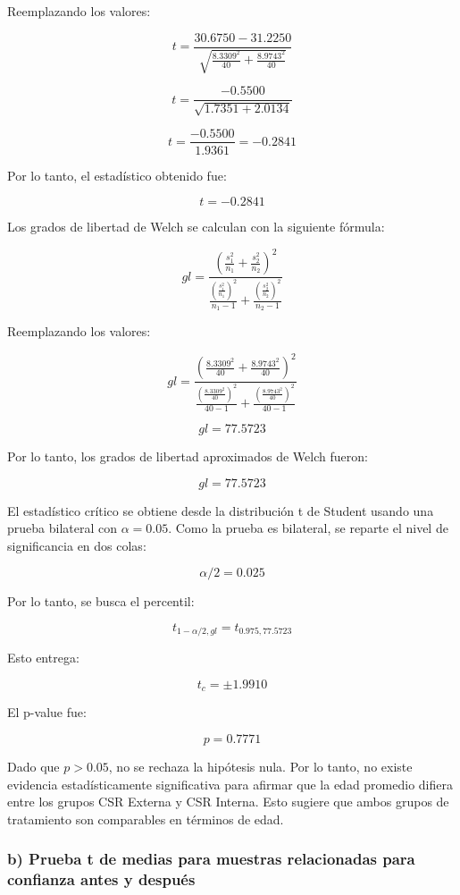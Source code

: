 \documentclass[12pt,letterpaper]{article}
\begin{document}
Reemplazando los valores:

\[
t =
\frac{30.6750 - 31.2250}
{\sqrt{\frac{8.3309^2}{40} + \frac{8.9743^2}{40}}}
\]

\[
t =
\frac{-0.5500}
{\sqrt{1.7351 + 2.0134}}
\]

\[
t =
\frac{-0.5500}{1.9361}
= -0.2841
\]

Por lo tanto, el estadístico obtenido fue:

\[
t = -0.2841
\]

Los grados de libertad de Welch se calculan con la siguiente fórmula:

\[
gl =
\frac{
\left(\frac{s_1^2}{n_1} + \frac{s_2^2}{n_2}\right)^2
}{
\frac{\left(\frac{s_1^2}{n_1}\right)^2}{n_1 - 1}
+
\frac{\left(\frac{s_2^2}{n_2}\right)^2}{n_2 - 1}
}
\]

Reemplazando los valores:

\[
gl =
\frac{
\left(\frac{8.3309^2}{40} + \frac{8.9743^2}{40}\right)^2
}{
\frac{\left(\frac{8.3309^2}{40}\right)^2}{40 - 1}
+
\frac{\left(\frac{8.9743^2}{40}\right)^2}{40 - 1}
}
\]

\[
gl = 77.5723
\]

Por lo tanto, los grados de libertad aproximados de Welch fueron:

\[
gl = 77.5723
\]

El estadístico crítico se obtiene desde la distribución t de Student usando una prueba bilateral con \(\alpha = 0.05\). Como la prueba es bilateral, se reparte el nivel de significancia en dos colas:

\[
\alpha/2 = 0.025
\]

Por lo tanto, se busca el percentil:

\[
t_{1-\alpha/2, gl} = t_{0.975, 77.5723}
\]

Esto entrega:

\[
t_c = \pm 1.9910
\]

El p-value fue:

\[
p = 0.7771
\]

Dado que \(p > 0.05\), no se rechaza la hipótesis nula. Por lo tanto, no existe evidencia estadísticamente significativa para afirmar que la edad promedio difiera entre los grupos CSR Externa y CSR Interna. Esto sugiere que ambos grupos de tratamiento son comparables en términos de edad.

\subsubsection*{b) Prueba t de medias para muestras relacionadas para confianza antes y después}
\end{document}
